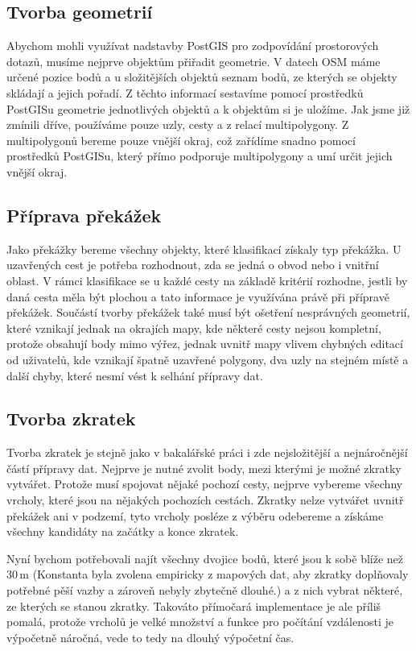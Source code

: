 \subsection{Tvorba geometrií}
Abychom mohli využívat nadstavby PostGIS pro zodpovídání prostorových dotazů,
musíme nejprve objektům přiřadit geometrie. V datech OSM máme určené pozice bodů
a u složitějších objektů seznam bodů, ze kterých se objekty skládají a jejich
pořadí. Z těchto informací sestavíme pomocí prostředků PostGISu geometrie
jednotlivých objektů a k objektům si je uložíme. Jak jsme již zmínili dříve,
používáme pouze uzly, cesty a z relací multipolygony. Z multipolygonů bereme
pouze vnější okraj, což zařídíme snadno pomocí prostředků PostGISu, který přímo
podporuje multipolygony a umí určit jejich vnější okraj.
 
\subsection{Příprava překážek}
Jako překážky bereme všechny objekty, které klasifikací získaly typ překážka.
U uzavřených cest je potřeba rozhodnout, zda se jedná o obvod nebo i vnitřní
oblast. V rámci klasifikace se u každé cesty na základě kritérií rozhodne,
jestli by daná cesta měla být plochou a tato informace je využívána právě při
přípravě překážek. Součástí tvorby překážek také musí být ošetření nesprávných
geometrií, které vznikají jednak na okrajích mapy, kde některé cesty nejsou
kompletní, protože obsahují body mimo výřez, jednak uvnitř mapy vlivem chybných
editací od uživatelů, kde vznikají špatně uzavřené polygony, dva uzly na stejném
místě a další chyby, které nesmí vést k selhání přípravy dat.

\subsection{Tvorba zkratek}
Tvorba zkratek je stejně jako v bakalářské práci i zde nejsložitější a
nejnáročnější částí přípravy dat. Nejprve je nutné zvolit body, mezi kterými je
možné zkratky vytvářet. Protože musí spojovat nějaké pochozí cesty, nejprve
vybereme všechny vrcholy, které jsou na nějakých pochozích cestách. Zkratky
nelze vytvářet uvnitř překážek ani v podzemí, tyto vrcholy posléze z výběru
odebereme a získáme všechny kandidáty na začátky a konce zkratek. 

Nyní bychom potřebovali najít všechny dvojice bodů, které jsou k sobě blíže než
30\,m (Konstanta byla zvolena empiricky z mapových dat, aby zkratky doplňovaly
potřebné pěší vazby a zároveň nebyly zbytečně dlouhé.) a z nich vybrat některé,
ze kterých se stanou zkratky. Takováto přímočará implementace je ale příliš
pomalá, protože vrcholů je velké množství a funkce pro počítání vzdálenosti je
výpočetně náročná, vede to tedy na dlouhý výpočetní čas.

